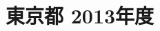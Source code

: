 \documentclass[../../hsm_tok_q.tex]{subfiles}
\begin{document}
    \section{東京都 2013年度}
    \subsection{　}
    
    \newpage
    \subsection{　}
    
    \newpage
    \subsection{　}
    
    \newpage
    \subsection{　}
    
    \newpage
    \subsection{　}
    
\end{document}
